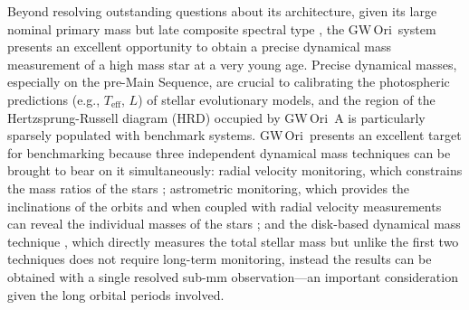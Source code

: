 \documentclass[twocolumn]{aastex61}
\newcommand{\todo}[1]{ \textcolor{red}{#1}}
\newcommand{\obj}{GW\,Ori}
\begin{document}
Beyond resolving outstanding questions about its architecture, given its large nominal primary mass but late composite spectral type \citep[$M_\mathrm{A} = 3.9\,M_\odot$, SpT = G8;][]{fang14,fang17}, the \obj\ system presents an excellent opportunity to obtain a precise dynamical mass measurement of a high mass star at a very young age. Precise dynamical masses, especially on the pre-Main Sequence, are crucial to calibrating the photospheric predictions (e.g., $T_\mathrm{eff}$, $L$) of stellar evolutionary models, and the region of the Hertzsprung-Russell diagram (HRD) occupied by \obj~A is particularly sparsely populated with benchmark systems. \obj\ presents an excellent target for benchmarking because three independent dynamical mass techniques can be brought to bear on it simultaneously:
radial velocity monitoring, which constrains the mass ratios of the stars \citep{mathieu91,fang14}; astrometric monitoring, which provides the inclinations of the orbits and when coupled with radial velocity measurements can reveal the individual masses of the stars \citep{berger11};
and the disk-based dynamical mass technique \citep[e.g.,][]{rosenfeld12b,czekala15a,czekala16}, which directly measures the total stellar mass but unlike the first two techniques does not require long-term monitoring, instead the results can be obtained with a single resolved sub-mm observation---an important consideration given the long orbital periods involved.
\end{document}
